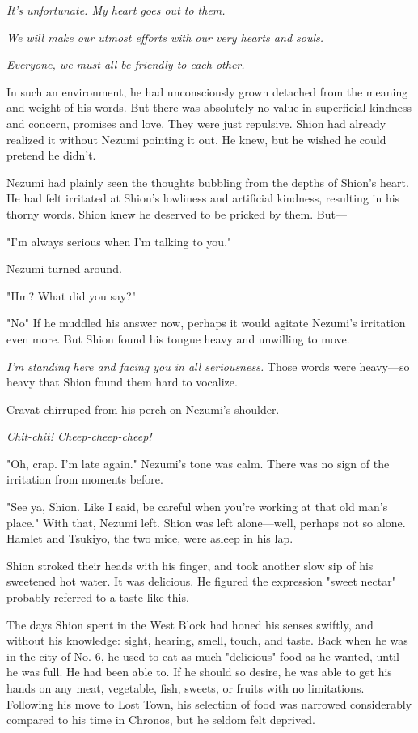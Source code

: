 \emph{It's unfortunate. My heart goes out to them.}

\emph{We will make our utmost efforts with our very hearts and souls.}

\emph{Everyone, we must all be friendly to each other.}

In such an environment, he had unconsciously grown detached from the
meaning and weight of his words. But there was absolutely no value in
superficial kindness and concern, promises and love. They were just
repulsive. Shion had already realized it without Nezumi pointing it out.
He knew, but he wished he could pretend he didn't.

Nezumi had plainly seen the thoughts bubbling from the depths of Shion's
heart. He had felt irritated at Shion's lowliness and artificial
kindness, resulting in his thorny words. Shion knew he deserved to be
pricked by them. But---

"I'm always serious when I'm talking to you."

Nezumi turned around.

"Hm? What did you say?"

"No\el " If he muddled his answer now, perhaps it would agitate
Nezumi's irritation even more. But Shion found his tongue heavy and
unwilling to move.

\emph{I'm standing here and facing you in all seriousness.} Those words were
heavy---so heavy that Shion found them hard to vocalize.

Cravat chirruped from his perch on Nezumi's shoulder.

\emph{Chit-chit! Cheep-cheep-cheep!}

"Oh, crap. I'm late again." Nezumi's tone was calm. There was no sign of
the irritation from moments before.

"See ya, Shion. Like I said, be careful when you're working at that old
man's place." With that, Nezumi left. Shion was left alone---well, perhaps
not so alone. Hamlet and Tsukiyo, the two mice, were asleep in his lap.

Shion stroked their heads with his finger, and took another slow sip of
his sweetened hot water. It was delicious. He figured the expression
"sweet nectar" probably referred to a taste like this.

The days Shion spent in the West Block had honed his senses swiftly, and
without his knowledge: sight, hearing, smell, touch, and taste. Back
when he was in the city of No. 6, he used to eat as much "delicious"
food as he wanted, until he was full. He had been able to. If he should
so desire, he was able to get his hands on any meat, vegetable, fish,
sweets, or fruits with no limitations. Following his move to Lost Town,
his selection of food was narrowed considerably compared to his time in
Chronos, but he seldom felt deprived.

